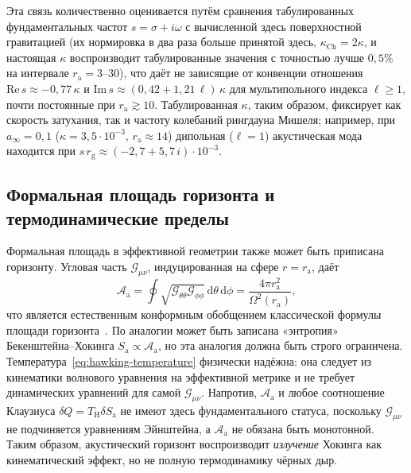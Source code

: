 \documentclass[12pt,a4paper,preprint]{elsarticle}
\begin{document}
            Эта связь количественно оценивается путём сравнения табулированных фундаментальных частот $s=\sigma+i\omega$ с вычисленной здесь поверхностной гравитацией (их нормировка в два раза больше принятой здесь, $\kappa_{\mathrm{Ch}}=2\kappa$, и настоящая $\kappa$ воспроизводит табулированные значения с точностью лучше $0{,}5\%$ на интервале $r_{\mathrm{a}}=3$--$30$), что даёт не зависящие от конвенции отношения $\mathrm{Re}\,s\approx-0{,}77\,\kappa$ и $\mathrm{Im}\,s\approx(0{,}42+1{,}21\,\ell)\,\kappa$ для мультипольного индекса $\ell\ge 1$, почти постоянные при $r_{\mathrm{a}}\gtrsim 10$. Табулированная $\kappa$, таким образом, фиксирует как скорость затухания, так и частоту колебаний рингдауна Мишеля; например, при $a_{\infty}=0{,}1$ ($\kappa=3{,}5\cdot10^{-3}$, $r_{\mathrm{a}}\approx14$) дипольная ($\ell=1$) акустическая мода находится при $s\,r_{\mathrm{g}}\approx(-2{,}7+5{,}7\,i)\cdot10^{-3}$.

        \subsection{Формальная площадь горизонта и термодинамические пределы}\label{subsec:thermodynamic-limits}
            Формальная площадь в эффективной геометрии также может быть приписана горизонту. Угловая часть $\mathcal{G}_{\mu\nu}$, индуцированная на сфере $r=r_{\mathrm{a}}$, даёт
            \begin{equation}
                \mathcal{A}_{\mathrm{a}} = \oint\sqrt{\mathcal{G}_{\theta\theta}\mathcal{G}_{\phi\phi}}\,\mathrm{d}\theta\,\mathrm{d}\phi = \frac{4\pi r^{2}_{\mathrm{a}}}{\Omega^{2}(r_{\mathrm{a}})} ,
                \label{eq:acoustic-horizon-area}
            \end{equation}
            что является естественным конформным обобщением классической формулы площади горизонта~\cite{ShapiroSL_TeukolskySA_BlackHolesWhiteDwarfsAndNeutronStarsThePhysicsOfCompactObjects_2004}. По аналогии может быть записана «энтропия» Бекенштейна--Хокинга $S_{\mathrm{a}}\propto\mathcal{A}_{\mathrm{a}}$, но эта аналогия должна быть строго ограничена. Температура~\eqref{eq:hawking-temperature} физически надёжна: она следует из кинематики волнового уравнения на эффективной метрике и не требует динамических уравнений для самой $\mathcal{G}_{\mu\nu}$. Напротив, $\mathcal{A}_{\mathrm{a}}$ и любое соотношение Клаузиуса $\delta Q=T_{\mathrm{H}}\delta S_{\mathrm{a}}$ не имеют здесь фундаментального статуса, поскольку $\mathcal{G}_{\mu\nu}$ не подчиняется уравнениям Эйнштейна, а $\mathcal{A}_{\mathrm{a}}$ не обязана быть монотонной. Таким образом, акустический горизонт воспроизводит \emph{излучение} Хокинга как кинематический эффект, но не полную термодинамику чёрных дыр.
\end{document}
